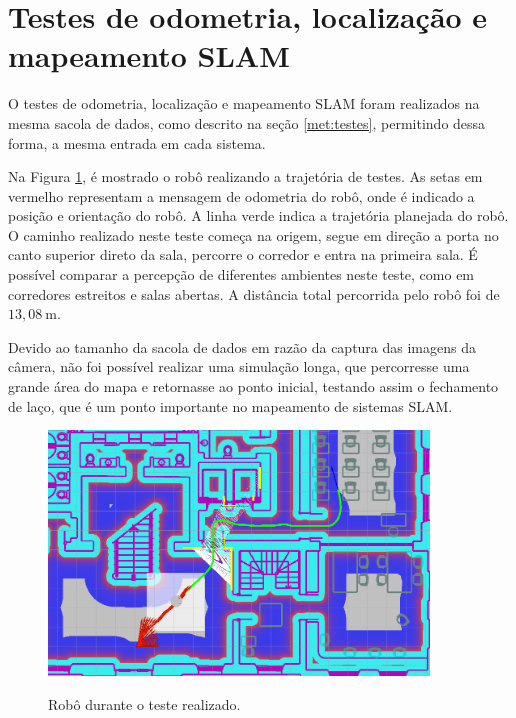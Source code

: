 \documentclass[repeatfields,xlists,xpacks,oneside,yearsonly]{ufrgscca}
\begin{document}
\section{Testes de odometria, localização e mapeamento SLAM}

O testes de odometria, localização e mapeamento SLAM foram realizados
na mesma sacola de dados, como descrito na seção \ref{met:testes},
permitindo dessa forma, a mesma entrada em cada sistema.

Na Figura \ref{fig:base_bag}, é mostrado o robô realizando a
trajetória de testes. As setas em vermelho representam a mensagem de
odometria do robô, onde é indicado a posição e orientação do robô. A
linha verde indica a trajetória planejada do robô. O caminho
realizado neste teste começa na origem, segue em direção a porta no
canto superior direto da sala, percorre o corredor e entra na
primeira sala. É possível comparar a percepção de diferentes
ambientes neste teste, como em corredores estreitos e salas abertas.
A distância total percorrida pelo robô foi de $13,08~\si{\meter}$.

Devido ao tamanho da sacola de dados em razão da captura das imagens
da câmera, não foi possível realizar uma simulação longa, que
percorresse uma grande área do mapa e retornasse ao ponto inicial,
testando assim o fechamento de laço, que é um ponto importante no
mapeamento de sistemas SLAM.

\begin{figure}[h]
    {
        \centering
        \caption{Robô durante o teste realizado.}
        \label{fig:base_bag}
        \includegraphics[width=0.9\textwidth]{base_bag_sim_zoom.png}\\
    }
\end{figure}
\end{document}
